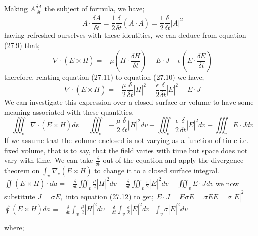 Making $\bar{A}\frac{\delta A}{\delta t} $ the subject of formula,
we have;
\begin{dmath}
\bar{A}\cdot\frac{\delta\bar{A}}{\delta t}=\frac{1}{2}\frac{\delta}{\delta t}(\bar{A}\cdot\bar{A})=\frac{1}{2}\frac{\delta}{\delta t} |A|^{2} 
\end{dmath}
having refreshed ourselves with these identities, we can deduce from equation (27.9)  that;
\begin{dmath}
\nabla\cdot(\bar{E}\times\bar{H}) = -\mu\left(\bar{H}\cdot\frac{\delta\bar{H}}{\delta t}\right) - \bar{E}\cdot\bar{J} - \epsilon\left(\bar{E}\cdot\frac{\delta\bar{E}}{\delta t}\right)
\end{dmath}
therefore, relating equation (27.11) to equation (27.10) we have;
\begin{dmath}
\nabla\cdot(\bar{E}\times\bar{H})=-\frac{\mu}{2}\frac{\delta}{\delta t}|\bar{H}|^{2} -  \frac{\epsilon}{2}\frac{\delta}{\delta t}|\bar{E}|^{2}-\bar{E}\cdot\bar{J} 
\end{dmath}
We can investigate this expression over a closed surface or volume to have some meaning associated with these quantities.
\begin{dmath*}
\iiint_{v}\nabla\cdot(\bar{E}\times\bar{H})dv  = \iiint_v-\frac{\mu}{2}\frac{\delta}{\delta t}|\bar{H}|^{2}dv-
\iiint_{v}\frac{\epsilon}{2}\frac{\delta}{\delta t}|\bar{E}|^{2}dv -\iiint_{v}\bar{E}\cdot\bar{J}dv 
\end{dmath*}
If we assume that the volume enclosed is not varying as a function of time i.e. fixed volume, that is to say, that the field varies with time but space does not vary with time. We can take $\frac{\delta}{\delta t}$ out of the equation and apply the divergence theorem on $ \int_{v}\nabla_{e}(\bar{E}\times\bar{H}) $ to change it to a closed surface integral.
\begin{math}
\iint(\bar{E}\times\bar{H})\cdot\bar{d}a  =  -\frac{\delta}{\delta t}  \iiint_{v}\frac{\mu}{2}|\bar{H}|^{2}dv -  \frac{\delta}{\delta t}\iiint_{v}\frac{\epsilon}{2}|\bar{E}|^{2}dv  -  \iiint_{v}\bar{E}\cdot\bar{J}dv 
\end{math}
we now substitute $ \bar{J}=\sigma\bar{E}, $ into equation (27.12) to get; 
$\bar{E}\cdot\bar{J}=\bar{E}\sigma\bar{E}=\sigma\bar{E}\bar{E}=\sigma|\bar{E}|^{2} $
$ \oint(\bar{E}\times\bar{H})\bar{d}a $ = - $ \frac{\delta}{\delta t}\int_{v} \frac{\mu}{2}|\bar{H}|^{2}dv$ - $ \frac{\delta}{\delta t}\int_{v}\frac{\epsilon}{2}|\bar{E}|^{2}dv$
-$ \int_{v}\sigma|\bar{E}|^{2}dv $

where;


